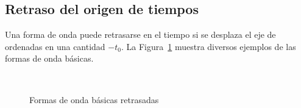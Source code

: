 \documentclass[11pt]{book} %
\begin{document}
	\subsection{Retraso del origen de tiempos}
	Una forma de onda puede retrasarse en el tiempo si se desplaza el eje de ordenadas en una cantidad $-t_0$. La Figura~\ref{fig.retraso} muestra diversos ejemplos de las formas de onda básicas. 
	\begin{figure}[htbp]
		\centering
		\hfil
		\\
		\hfil
		\caption{Formas de onda básicas retrasadas}
		\label{fig.retraso}
	\end{figure}
	
	
	
	
\end{document}
